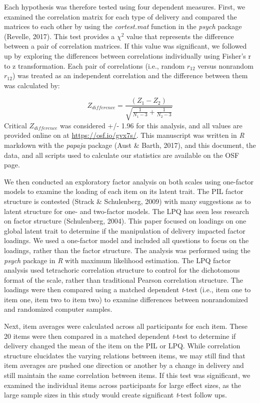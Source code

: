 \documentclass[english,man]{apa6}
\theoremstyle{definition}
\theoremstyle{definition}
\theoremstyle{definition}
\theoremstyle{remark}
\begin{document}
Each hypothesis was therefore tested using four dependent measures.
First, we examined the correlation matrix for each type of delivery and
compared the matrices to each other by using the \emph{cortest.mat}
function in the \emph{psych} package (Revelle, 2017). This test provides
a \(\chi^2\) value that represents the difference between a pair of
correlation matrices. If this value was significant, we followed up by
exploring the differences between correlations individually using
Fisher's r to z transformation. Each pair of correlations (i.e., random
\(r_{12}\) versus nonrandom \(r_{12}\)) was treated as an independent
correlation and the difference between them was calculated by:

\[
Z_{difference} = \frac{(Z_{1} - Z_{2})} { \sqrt{ \frac{1} {N_{1} - 3} + \frac{1} {N_{2} - 3}} }
\] Critical \(Z_{difference}\) was considered +/- 1.96 for this
analysis, and all values are provided online on at
\url{https://osf.io/gvx7s/}. This manuscript was written in \emph{R}
markdown with the \emph{papaja} package (Aust \& Barth, 2017), and this
document, the data, and all scripts used to calculate our statistics are
available on the OSF page.

We then conducted an exploratory factor analysis on both scales using
one-factor models to examine the loading of each item on its latent
trait. The PIL factor structure is contested (Strack \& Schulenberg,
2009) with many suggestions as to latent structure for one- and
two-factor models. The LPQ has seen less research on factor structure
(Schulenberg, 2004). This paper focused on loadings on one global latent
trait to determine if the manipulation of delivery impacted factor
loadings. We used a one-factor model and included all questions to focus
on the loadings, rather than the factor structure. The analysis was
performed using the \emph{psych} package in \emph{R} with maximum
likelihood estimation. The LPQ factor analysis used tetrachoric
correlation structure to control for the dichotomous format of the
scale, rather than traditional Pearson correlation structure. The
loadings were then compared using a matched dependent \emph{t}-test
(i.e., item one to item one, item two to item two) to examine
differences between nonrandomized and randomized computer samples.

Next, item averages were calculated across all participants for each
item. These 20 items were then compared in a matched dependent
\emph{t}-test to determine if delivery changed the mean of the item on
the PIL or LPQ. While correlation structure elucidates the varying
relations between items, we may still find that item averages are pushed
one direction or another by a change in delivery and still maintain the
same correlation between items. If this test was significant, we
examined the individual items across participants for large effect
sizes, as the large sample sizes in this study would create significant
\emph{t}-test follow ups.
\end{document}
